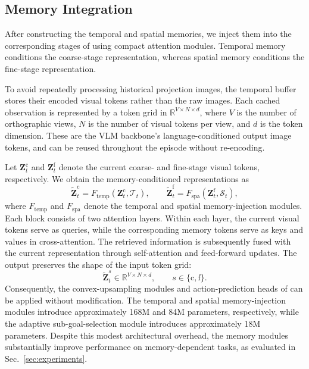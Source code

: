 \subsection{Memory Integration}
\label{sec:memmethod:integration}

After constructing the temporal and spatial memories, we inject them into
the corresponding stages of \method using compact attention modules.
Temporal memory conditions the coarse-stage representation, whereas spatial
memory conditions the fine-stage representation.

To avoid repeatedly processing historical projection images, the temporal
buffer stores their encoded visual tokens rather than the raw images.
Each cached observation is represented by a token grid in
$\mathbb{R}^{V\times N\times d}$, where $V$ is the number of orthographic
views, $N$ is the number of visual tokens per view, and $d$ is the token
dimension.
These are the VLM backbone's language-conditioned output image tokens, 
and can be reused throughout the episode without re-encoding.

Let $\mathbf{Z}^{\mathrm{c}}_t$ and
$\mathbf{Z}^{\mathrm{f}}_t$ denote the current coarse- and fine-stage visual
tokens, respectively.
We obtain the memory-conditioned representations as
\begin{equation}
    \widetilde{\mathbf{Z}}^{\mathrm{c}}_t
    =
    F_{\mathrm{temp}}
    \left(
        \mathbf{Z}^{\mathrm{c}}_t,
        \mathcal{T}_t
    \right),
    \qquad
    \widetilde{\mathbf{Z}}^{\mathrm{f}}_t
    =
    F_{\mathrm{spa}}
    \left(
        \mathbf{Z}^{\mathrm{f}}_t,
        \mathcal{S}_t
    \right),
    \label{eq:memory_integration}
\end{equation}
where $F_{\mathrm{temp}}$ and $F_{\mathrm{spa}}$ denote the temporal and
spatial memory-injection modules.
Each block consists of two attention layers.
Within each layer, the current visual tokens serve as queries, while the
corresponding memory tokens serve as keys and values in cross-attention.
The retrieved information is subsequently fused with the current
representation through self-attention and feed-forward updates.
The output preserves the shape of the input token grid:
\begin{equation}
    \widetilde{\mathbf{Z}}^{s}_t
    \in
    \mathbb{R}^{V\times N\times d},
    \qquad
    s\in\{\mathrm{c},\mathrm{f}\}.
    \label{eq:memory_output_shape}
\end{equation}
Consequently, the convex-upsampling modules and action-prediction heads of
\method can be applied without modification.
The temporal and spatial memory-injection modules introduce approximately
168M and 84M parameters, respectively, while the adaptive sub-goal-selection
module introduces approximately 18M parameters.
Despite this modest architectural overhead, the memory modules substantially
improve performance on memory-dependent tasks, as evaluated in
Sec.~\ref{sec:experiments}.

